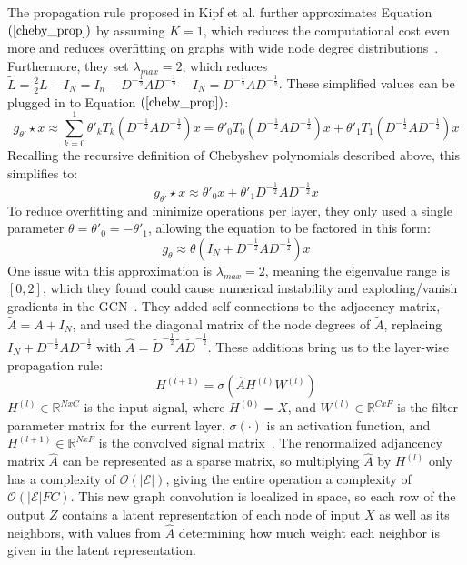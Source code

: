 The propagation rule proposed in Kipf et al. further approximates Equation 
$(\ref{cheby_prop})$ by assuming $K = 1$, which reduces the computational cost even more and reduces overfitting on graphs with wide node degree distributions~\cite{Kipf2016}. Furthermore, they set $\lambda_{max} = 2$, which reduces $\tilde{L} = \frac{2}{2}L - I_N = I_n - D^{-\frac{1}{2}}AD^{-\frac{1}{2}} - I_N = D^{-\frac{1}{2}}AD^{-\frac{1}{2}}$. These simplified values can be plugged in to Equation $(\ref{cheby_prop})$:
\begin{equation}
\label{reduce_k}
g_{\theta'} \star x \approx \sum\limits_{k=0}^{1} \theta'_k T_k (D^{-\frac{1}{2}}AD^{-\frac{1}{2}})x = \theta'_0 T_0(D^{-\frac{1}{2}}AD^{-\frac{1}{2}})x + \theta'_1 T_1(D^{-\frac{1}{2}}AD^{-\frac{1}{2}})x 
\end{equation}
Recalling the recursive definition of Chebyshev polynomials described above, this simplifies to:
\begin{equation}
\label{simplified_1stcheby}
g_{\theta'} \star x \approx \theta'_0x + \theta'_1 D^{-\frac{1}{2}}AD^{-\frac{1}{2}}x 
\end{equation}
To reduce overfitting and minimize operations per layer, they only used a single parameter $\theta = \theta'_0 = -\theta'_1$, allowing the equation to be factored in this form:
\begin{equation}
\label{single_param}
g_\theta \approx \theta(I_N + D^{-\frac{1}{2}}AD^{-\frac{1}{2}})x
\end{equation}
One issue with this approximation is $\lambda_{max} = 2$, meaning the eigenvalue range is $[0,2]$, which they found could cause numerical instability and exploding/vanish gradients in the GCN~\cite{Kipf2016}. They added self connections to the adjacency matrix, $\tilde{A} = A + I_N$, and used the diagonal matrix of the node degrees of $\tilde{A}$, replacing $I_N + D^{-\frac{1}{2}}AD^{-\frac{1}{2}}$ with $\hat{A} = \tilde{D}^{-\frac{1}{2}}\tilde{A}\tilde{D}^{-\frac{1}{2}}$. These additions bring us to the layer-wise propagation rule:
\begin{equation}
\label{prop_rule}
H^{(l+1)} = \sigma(\hat{A}H^{(l)}W^{(l)})
\end{equation}
$H^{(l)} \in \mathbb{R}^{N x C}$ is the input signal, where $H^{(0)} = X$, and $W^{(l)} \in \mathbb{R}^{C x F}$ is the filter parameter matrix for the current layer, $\sigma(\cdot)$ is an activation function, and $H^{(l+1)} \in \mathbb{R}^{N x F}$ is the convolved signal matrix~\cite{Kipf2016}. The renormalized adjancency matrix $\hat{A}$ can be represented as a sparse matrix, so multiplying $\hat{A}$ by $H^{(l)}$ only has a complexity of $\mathcal{O}(|\mathcal{E}|)$, giving the entire operation a complexity of $\mathcal{O}(|\mathcal{E}|FC)$.  This new graph convolution is localized in space, so each row of the output $Z$ contains a latent representation of each node of input $X$ as well as its neighbors, with values from $\hat{A}$ determining how much weight each neighbor is given in the latent representation.

